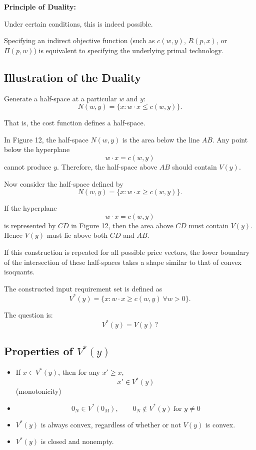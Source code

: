\medskip

\textbf{Principle of Duality:}

Under certain conditions, this is indeed possible.

Specifying an indirect objective function (such as $c(w,y)$, $R(p,x)$, or $\Pi(p,w)$)
is equivalent to specifying the underlying primal technology.




\subsection{Illustration of the Duality}

Generate a half-space at a particular $w$ and $y$:
\[
N(w,y)=\{x : w\cdot x \le c(w,y)\}.
\]

That is, the cost function defines a half-space.

\medskip

In Figure 12, the half-space $N(w,y)$ is the area below the line $AB$.
Any point below the hyperplane
\[
w\cdot x = c(w,y)
\]
cannot produce $y$.
Therefore, the half-space above $AB$ should contain $V(y)$.

Now consider the half-space defined by
\[
N(w,y)=\{x : w\cdot x \ge c(w,y)\}.
\]

If the hyperplane
\[
w\cdot x = c(w,y)
\]
is represented by $CD$ in Figure 12, then the area above $CD$ must contain $V(y)$.
Hence $V(y)$ must lie above both $CD$ and $AB$.

If this construction is repeated for all possible price vectors,
the lower boundary of the intersection of these half-spaces takes a shape
similar to that of convex isoquants.

\medskip

The constructed input requirement set is defined as
\[
V^*(y)=\{x : w\cdot x \ge c(w,y)\ \forall w>0\}.
\]

The question is:
\[
V^*(y)=V(y)\, ?
\]

\subsection*{Properties of $V^*(y)$}

\begin{itemize}
    \item[$V^*$.1] If $x \in V^*(y)$, then for any $x' \ge x$,
    \[
    x' \in V^*(y)
    \]
    \hfill (monotonicity)

    \item[$V^*$.2]
    \[
    0_N \in V^*(0_M),
    \qquad
    0_N \notin V^*(y)\ \text{for } y \ne 0
    \]

    \item[$V^*$.3] $V^*(y)$ is always convex, regardless of whether or not $V(y)$ is convex.

    \item[$V^*$.4] $V^*(y)$ is closed and nonempty.
\end{itemize}





